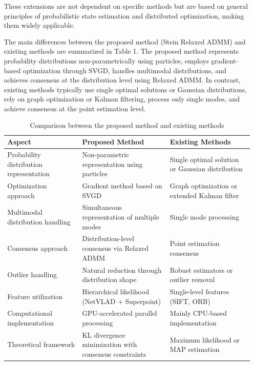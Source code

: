 \documentclass[a4paper,fleqn,10pt,twocolumn]{SICE_ISCS}
\begin{document}
These extensions are not dependent on specific methods but are based on general principles of probabilistic state estimation and distributed optimization, making them widely applicable.

The main differences between the proposed method (Stein Relaxed ADMM) and existing methods are summarized in Table 1. The proposed method represents probability distributions non-parametrically using particles, employs gradient-based optimization through SVGD, handles multimodal distributions, and achieves consensus at the distribution level using Relaxed ADMM. In contrast, existing methods typically use single optimal solutions or Gaussian distributions, rely on graph optimization or Kalman filtering, process only single modes, and achieve consensus at the point estimation level.

\begin{table}[t]
\caption{Comparison between the proposed method and existing methods}
\label{tab:comparison}
\centering
\begin{tabular}{|p{3.5cm}|p{4.2cm}|p{4.2cm}|}
\hline
\textbf{Aspect} & \textbf{Proposed Method} & \textbf{Existing Methods} \\
\hline
Probability distribution representation & Non-parametric representation using particles & Single optimal solution or Gaussian distribution \\
\hline
Optimization approach & Gradient method based on SVGD & Graph optimization or extended Kalman filter \\
\hline
Multimodal distribution handling & Simultaneous representation of multiple modes & Single mode processing \\
\hline
Consensus approach & Distribution-level consensus via Relaxed ADMM & Point estimation consensus \\
\hline
Outlier handling & Natural reduction through distribution shape & Robust estimators or outlier removal \\
\hline
Feature utilization & Hierarchical likelihood (NetVLAD + Superpoint) & Single-level features (SIFT, ORB) \\
\hline
Computational implementation & GPU-accelerated parallel processing & Mainly CPU-based implementation \\
\hline
Theoretical framework & KL divergence minimization with consensus constraints & Maximum likelihood or MAP estimation \\
\hline
\end{tabular}
\end{table}
\end{document}
